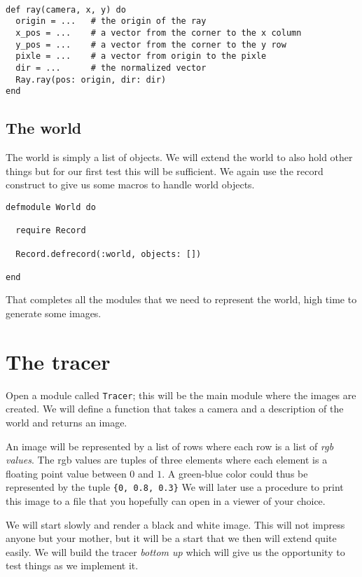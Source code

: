 \documentclass[a4paper,11pt]{article}
\begin{document}
\begin{verbatim}

def ray(camera, x, y) do
  origin = ...   # the origin of the ray
  x_pos = ...    # a vector from the corner to the x column
  y_pos = ...    # a vector from the corner to the y row
  pixle = ...    # a vector from origin to the pixle
  dir = ...      # the normalized vector
  Ray.ray(pos: origin, dir: dir)
end
\end{verbatim}


\subsection*{The world}

The world is simply a list of objects. We will extend the world to
also hold other things but for our first test this will be
sufficient. We again use the record construct to give us some macros
to handle world objects.

\begin{verbatim}
defmodule World do

  require Record  

  Record.defrecord(:world, objects: [])

end
\end{verbatim}

That completes all the modules that we need to represent the world,
high time to generate some images.



\section{The tracer}

Open a module called {\tt Tracer}; this will be the main module where
the images are created. We will define a function that takes a camera
and a description of the world and returns an image.

An image will be represented by a list of rows where each row is a
list of {\em rgb values}. The rgb values are tuples of three elements
where each element is a floating point value between $0$ and $1$. A
green-blue color could thus be represented by the tuple {\tt \{0, 0.8,
  0.3\}} We will later use a procedure to print this image to a file
that you hopefully can open in a viewer of your choice.

We will start slowly and render a black and white image. This will not
impress anyone but your mother, but it will be a start that we then
will extend quite easily. We will build the tracer {\em bottom up}
which will give us the opportunity to test things as we implement
it. 
\end{document}
